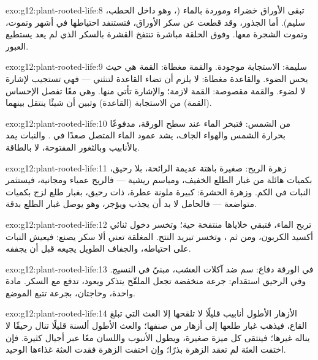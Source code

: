 \begin{solution}{exo:g12:plant-rooted-life:8}
تبقى الأوراق خضراء وموردة بالماء (، وهو داخل الحطب، سليم). أما
الجذور، وقد قطعت عن سكر الأوراق، فتستنفد احتياطها في أشهر وتموت،
وتموت الشجرة معها. وفوق الحلقة مباشرة تنتفخ القشرة بالسكر الذي لم يعد
يستطيع العبور.
\end{solution}

\begin{solution}{exo:g12:plant-rooted-life:9}
سليمة: الاستجابة موجودة. والقمة مغطاة: القمة هي حيث يحس الضوء.
والقاعدة مغطاة: لا يلزم أن تضاء القاعدة لتنثني --- فهي تستجيب لإشارة
لا لضوء. والقمة مقصوصة: القمة لازمة؛ والإشارة تأتي منها. وهي معًا تفصل
الإحساس (القمة) من الاستجابة (القاعدة) وتبين أن شيئًا ينتقل بينهما.
\end{solution}

\begin{solution}{exo:g12:plant-rooted-life:10}
من الشمس: فتبخر الماء عند سطح الورقة، مدفوعًا بحرارة الشمس والهواء
الجاف، يشد عمود الماء المتصل صعدًا في . والنبات يمد بالأنابيب
وبالثغور المفتوحة، لا بالطاقة.
\end{solution}

\begin{solution}{exo:g12:plant-rooted-life:11}
زهرة الريح: صغيرة باهتة عديمة الرائحة، بلا رحيق، بكميات هائلة من
غبار الطلع الخفيف، ومياسم ريشية --- فالريح عمياء ومجانية، فيستثمر النبات
في الكم. وزهرة الحشرة: كبيرة ملونة عطرة، ذات رحيق، بغبار طلع لزج بكميات
متواضعة --- فالحامل لا بد أن يجذب ويؤجر، وهو يوصل غبار الطلع بدقة.
\end{solution}

\begin{solution}{exo:g12:plant-rooted-life:12}
تربح الماء، فتبقي خلاياها منتفخة حية؛ وتخسر دخول ثنائي أكسيد الكربون،
ومن ثم ، وتخسر تبريد النتح.  المغلقة تعني ألا سكر
يصنع: فيعيش النبات على احتياطه، والجفاف الطويل يجيعه قبل أن يجففه.
\end{solution}

\begin{solution}{exo:g12:plant-rooted-life:13}
في الورقة دفاع: سم ضد آكلات العشب، مبنيّ في النسيج. وفي الرحيق
استقدام: جرعة منخفضة تجعل الملقّح يتذكر ويعود، تدفع مع السكر. مادة
واحدة، وحاجتان، بجرعة تتبع الموضع.
\end{solution}

\begin{solution}{exo:g12:plant-rooted-life:14}
الأزهار الأطول أنابيب قليلًا لا تلقحها إلا العث التي تبلغ القاع،
فيذهب غبار طلعها إلى أزهار من صنفها؛ والعث الأطول ألسنة قليلًا تنال رحيقًا
لا يناله غيرها؛ فينتقى كل ميزة صغيرة، ويطول الأنبوب واللسان معًا عبر
أجيال كثيرة. فإن اختفت العثة لم تعقد الزهرة بذرًا؛ وإن اختفت الزهرة
فقدت العثة غذاءها الوحيد.
\end{solution}

